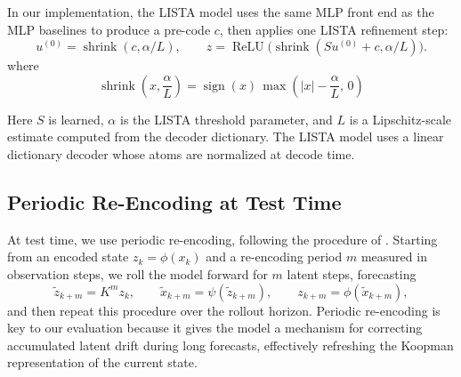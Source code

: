 \documentclass{article}
\begin{document}

In our implementation, the LISTA model uses the same MLP front end as the MLP baselines to produce a pre-code $c$, then applies one LISTA refinement step:
\begin{equation}
\label{eq:lista-refinement-step}
u^{(0)} = \operatorname{shrink}(c, \alpha/L),
\qquad
z = \operatorname{ReLU}\!\bigl(\operatorname{shrink}(S u^{(0)} + c, \alpha/L)\bigr).
\end{equation}
where
\begin{equation}
\operatorname{shrink}\!\left(x, \frac{\alpha}{L}\right)
  =
  \operatorname{sign}(x)\,\max\!\left(|x| - \frac{\alpha}{L},\, 0\right)
\end{equation}

Here $S$ is learned, $\alpha$ is the LISTA threshold parameter, and $L$ is a Lipschitz-scale estimate computed from the decoder dictionary. The LISTA model uses a linear dictionary decoder whose atoms are normalized at decode time.



\subsection{Periodic Re-Encoding at Test Time}

At test time, we use periodic re-encoding, following the procedure of \citet{fathi_course_2023}. Starting from an encoded state $z_k = \phi(x_k)$ and a re-encoding period $m$ measured in observation steps, we roll the model forward for $m$ latent steps, forecasting
\begin{equation}
    \tilde{z}_{k+m} = K^m z_k, \qquad
    \tilde{x}_{k+m} = \psi(\tilde{z}_{k+m}), \qquad
    z_{k+m} = \phi(\tilde{x}_{k+m}),
\end{equation}
and then repeat this procedure over the rollout horizon. Periodic re-encoding is key to our evaluation because it gives the model a mechanism for correcting accumulated latent drift during long forecasts, effectively refreshing the Koopman representation of the current state.
\end{document}
